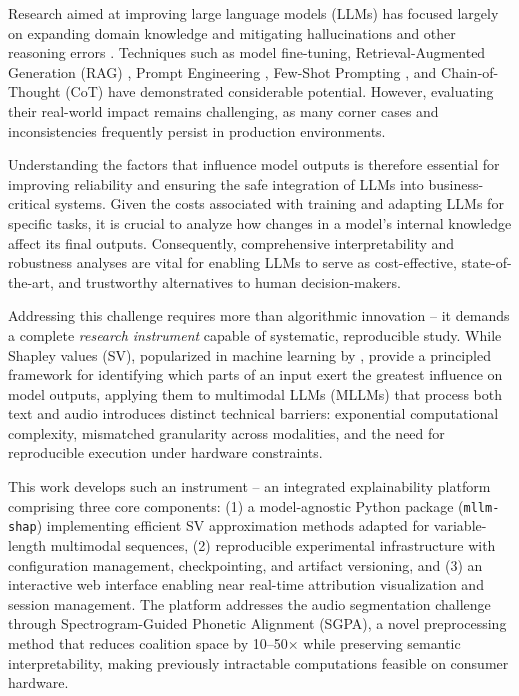 Research aimed at improving large language models (LLMs) has focused largely on expanding domain knowledge and mitigating hallucinations and other reasoning errors \parencite{llmdirectionsoverview}. Techniques such as model fine-tuning, Retrieval-Augmented Generation (RAG) \parencite{lewis2021retrievalaugmentedgenerationknowledgeintensivenlp}, Prompt Engineering \parencite{schulhoff2025promptreportsystematicsurvey}, Few-Shot Prompting \parencite{brown2020languagemodelsfewshotlearners}, and Chain-of-Thought (CoT) \parencite{wei2023chainofthoughtpromptingelicitsreasoning} have demonstrated considerable potential. However, evaluating their real-world impact remains challenging, as many corner cases and inconsistencies frequently persist in production environments.

Understanding the factors that influence model outputs is therefore essential for improving reliability and ensuring the safe integration of LLMs into business-critical systems. Given the costs associated with training and adapting LLMs for specific tasks, it is crucial to analyze how changes in a model's internal knowledge affect its final outputs. Consequently, comprehensive interpretability and robustness analyses are vital for enabling LLMs to serve as cost-effective, state-of-the-art, and trustworthy alternatives to human decision-makers.

Addressing this challenge requires more than algorithmic innovation -- it demands a complete \emph{research instrument} capable of systematic, reproducible study. While Shapley values (SV), popularized in machine learning by \textcite{lundberg2017unifiedapproachinterpretingmodel}, provide a principled framework for identifying which parts of an input exert the greatest influence on model outputs, applying them to multimodal LLMs (MLLMs) that process both text and audio introduces distinct technical barriers: exponential computational complexity, mismatched granularity across modalities, and the need for reproducible execution under hardware constraints.

\newpage
This work develops such an instrument -- an integrated explainability platform comprising three core components: (1) a model-agnostic Python package (\texttt{mllm-shap}) implementing efficient SV approximation methods adapted for variable-length multimodal sequences, (2) reproducible experimental infrastructure with configuration management, checkpointing, and artifact versioning, and (3) an interactive web interface enabling near real-time attribution visualization and session management. The platform addresses the audio segmentation challenge through Spectrogram-Guided Phonetic Alignment (SGPA), a novel preprocessing method that reduces coalition space by 10--50$\times$ while preserving semantic interpretability, making previously intractable computations feasible on consumer hardware.

